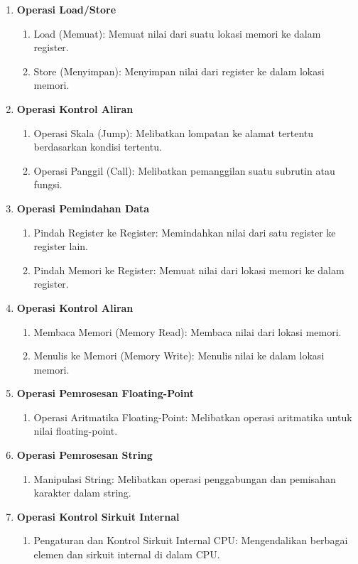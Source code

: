 \begin{enumerate}[label=\alph*]
  \item \textbf{Operasi Load/Store}
    \begin{enumerate}[label=\roman*.]
      \item Load (Memuat): Memuat nilai dari suatu lokasi memori ke dalam register.
      \item Store (Menyimpan): Menyimpan nilai dari register ke dalam lokasi memori.
    \end{enumerate}

  \item \textbf{Operasi Kontrol Aliran}
  \begin{enumerate}[label=\roman*.]
    \item Operasi Skala (Jump): Melibatkan lompatan ke alamat tertentu berdasarkan kondisi tertentu.
    \item Operasi Panggil (Call): Melibatkan pemanggilan suatu subrutin atau fungsi.
  \end{enumerate}

  \item \textbf{Operasi Pemindahan Data}
  \begin{enumerate}[label=\roman*.]
    \item Pindah Register ke Register: Memindahkan nilai dari satu register ke register lain.
    \item Pindah Memori ke Register: Memuat nilai dari lokasi memori ke dalam register.
  \end{enumerate}

\item \textbf{Operasi Kontrol Aliran}
    \begin{enumerate}[label=\roman*.]
      \item Membaca Memori (Memory Read): Membaca nilai dari lokasi memori.
      \item Menulis ke Memori (Memory Write): Menulis nilai ke dalam lokasi memori.
    \end{enumerate}

  \item \textbf{Operasi Pemrosesan Floating-Point}
    \begin{enumerate}[label=\roman*.]
      \item  Operasi Aritmatika Floating-Point: Melibatkan operasi aritmatika untuk nilai floating-point.
    \end{enumerate}

  \item \textbf{Operasi Pemrosesan String}
  \begin{enumerate}[label=\roman*.]
    \item Manipulasi String: Melibatkan operasi penggabungan dan pemisahan karakter dalam string.
  \end{enumerate}

  \item \textbf{Operasi Kontrol Sirkuit Internal}
  \begin{enumerate}[label=\roman*.]
    \item  Pengaturan dan Kontrol Sirkuit Internal CPU: Mengendalikan berbagai elemen dan sirkuit internal di dalam CPU.
  \end{enumerate}

\end{enumerate}
